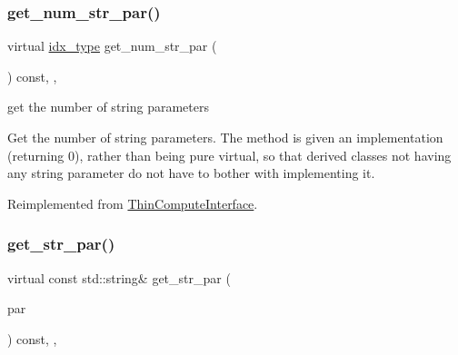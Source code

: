 \subsubsection{\texorpdfstring{get\+\_\+num\+\_\+str\+\_\+par()}{get\_num\_str\_par()}}
{\footnotesize\ttfamily virtual \mbox{\hyperlink{class_s_m_spp__di__unipi__it_1_1_thin_compute_interface_aa3d710629ad8c434286726ad810c3b47}{idx\+\_\+type}} get\+\_\+num\+\_\+str\+\_\+par (\begin{DoxyParamCaption}\item[{void}]{ }\end{DoxyParamCaption}) const\hspace{0.3cm}{\ttfamily [inline]}, {\ttfamily [override]}, {\ttfamily [virtual]}}



get the number of string parameters 

Get the number of string parameters. The method is given an implementation (returning 0), rather than being pure virtual, so that derived classes not having any string parameter do not have to bother with implementing it. 

Reimplemented from \mbox{\hyperlink{class_s_m_spp__di__unipi__it_1_1_thin_compute_interface_a23ef8ba7477625aec4a54dddff053468}{Thin\+Compute\+Interface}}.

\mbox{\label{class_s_m_spp__di__unipi__it_1_1_f_real_objective_a3e17318e51ccc01da85e2627b810d6a7}} 
\subsubsection{\texorpdfstring{get\+\_\+str\+\_\+par()}{get\_str\_par()}}
{\footnotesize\ttfamily virtual const std\+::string\& get\+\_\+str\+\_\+par (\begin{DoxyParamCaption}\item[{const \mbox{\hyperlink{class_s_m_spp__di__unipi__it_1_1_thin_compute_interface_aa3d710629ad8c434286726ad810c3b47}{idx\+\_\+type}}}]{par }\end{DoxyParamCaption}) const\hspace{0.3cm}{\ttfamily [inline]}, {\ttfamily [override]}, {\ttfamily [virtual]}}



